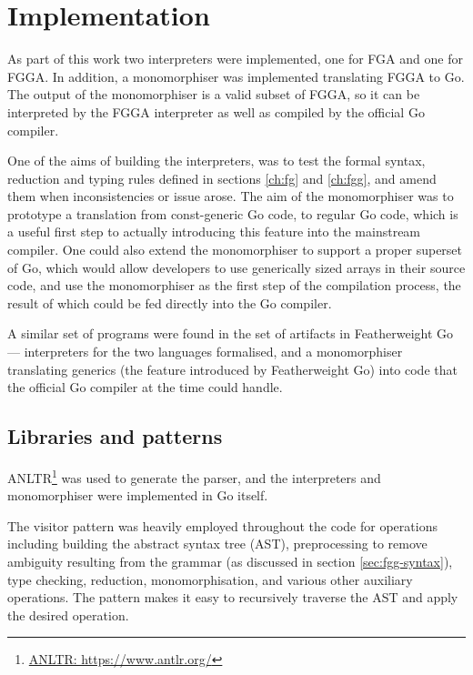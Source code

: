 \section{Implementation}
\label{ch:interpter-impl}

As part of this work two interpreters were implemented, one for FGA and one for
FGGA. In addition, a monomorphiser was implemented translating FGGA to Go. The
output of the monomorphiser is a valid subset of FGGA, so it can be interpreted
by the FGGA interpreter as well as compiled by the official Go compiler.

One of the aims of building the interpreters, was to test the formal syntax,
reduction and typing rules defined in sections \ref{ch:fg} and \ref{ch:fgg}, and
amend them when inconsistencies or issue arose. The aim of the monomorphiser was
to prototype a translation from const-generic Go code, to regular Go code, which
is a useful first step to actually introducing this feature into the mainstream
compiler. One could also extend the monomorphiser to support a proper superset
of Go, which would allow developers to use generically sized arrays in their
source code, and use the monomorphiser as the first step of the compilation
process, the result of which could be fed directly into the Go compiler.

A similar set of programs were found in the set of artifacts in Featherweight Go
\autocite{fg} --- interpreters for the two languages formalised, and a
monomorphiser translating generics (the feature introduced by Featherweight Go)
into code that the official Go compiler at the time could handle.

\subsection{Libraries and patterns}

ANLTR\footnote{\href{https://www.antlr.org/}{ANLTR: https://www.antlr.org/}} was
used to generate the parser, and the interpreters and monomorphiser were
implemented in Go itself.

The visitor pattern was heavily employed throughout the code for operations
including building the abstract syntax tree (AST), preprocessing to remove
ambiguity resulting from the grammar (as discussed in section
\ref{sec:fgg-syntax}), type checking, reduction, monomorphisation, and various
other auxiliary operations. The pattern makes it easy to recursively traverse
the AST and apply the desired operation.


